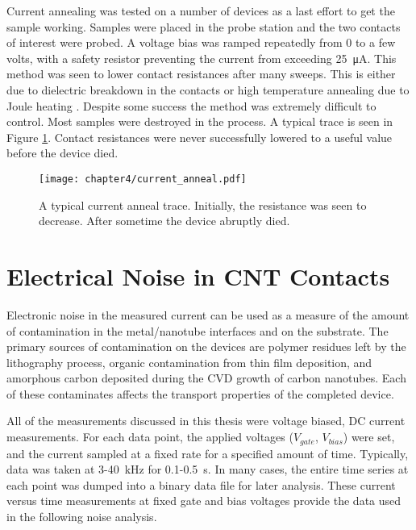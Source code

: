 Current annealing was tested on a number of devices as a last effort to get the sample working. Samples were placed in the probe station and the two contacts of interest were probed. A voltage bias was ramped repeatedly from 0 to a few volts, with a safety resistor preventing the current from exceeding \SI{25}{\micro\ampere}. This method was seen to lower contact resistances after many sweeps. This is either due to dielectric breakdown in the contacts or high temperature annealing due to Joule heating \cite{Maki2004, Woo2007, Dong2007}. Despite some success the method was extremely difficult to control. Most samples were destroyed in the process. A typical trace is seen in Figure \ref{fig:current_anneal}. Contact resistances were never successfully lowered to a useful value before the device died.

\begin{figure}
    \centering
    \texttt{[image: chapter4/current\_anneal.pdf]}
    \caption{A typical current anneal trace. Initially, the resistance was seen to decrease. After sometime the device abruptly died.}
    \label{fig:current_anneal}
\end{figure}
    
\section{Electrical Noise in CNT Contacts}

Electronic noise in the measured current can be used as a measure of the amount of contamination in the metal/nanotube interfaces and on the substrate. The primary sources of contamination on the devices are polymer residues left by the lithography process, organic contamination from thin film deposition, and amorphous carbon deposited during the CVD growth of carbon nanotubes. Each of these contaminates affects the transport properties of the completed device. 

All of the measurements discussed in this thesis were voltage biased, DC current measurements. For each data point, the applied voltages ($V_{gate}$, $V_{bias}$) were set, and the current sampled at a fixed rate for a specified amount of time. Typically, data was taken at 3-\SI{40}{\kilo\hertz} for 0.1-\SI{0.5}{\second}. In many cases, the entire time series at each point was dumped into a binary data file for later analysis. These current versus time measurements at fixed gate and bias voltages provide the data used in the following noise analysis.

